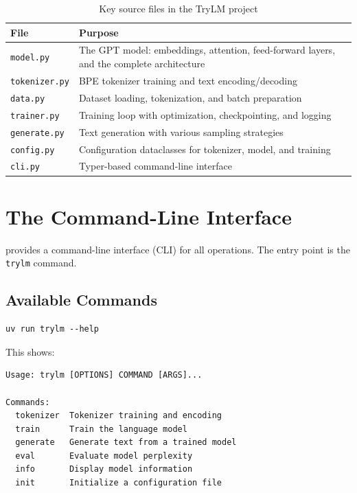 \begin{table}[H]
\centering
\begin{tabular}{lp{8cm}}
\toprule
\textbf{File} & \textbf{Purpose} \\
\midrule
\texttt{model.py} & The GPT model: embeddings, attention, feed-forward layers, and the complete architecture \\
\texttt{tokenizer.py} & BPE tokenizer training and text encoding/decoding \\
\texttt{data.py} & Dataset loading, tokenization, and batch preparation \\
\texttt{trainer.py} & Training loop with optimization, checkpointing, and logging \\
\texttt{generate.py} & Text generation with various sampling strategies \\
\texttt{config.py} & Configuration dataclasses for tokenizer, model, and training \\
\texttt{cli.py} & Typer-based command-line interface \\
\bottomrule
\end{tabular}
\caption{Key source files in the TryLM project}
\end{table}

\section{The Command-Line Interface}

\TryLM provides a command-line interface (CLI) for all operations. The entry point is the \texttt{trylm} command.

\subsection{Available Commands}

\begin{lstlisting}[style=shell]
uv run trylm --help
\end{lstlisting}

This shows:
\begin{lstlisting}[style=shell, numbers=none]
Usage: trylm [OPTIONS] COMMAND [ARGS]...

Commands:
  tokenizer  Tokenizer training and encoding
  train      Train the language model
  generate   Generate text from a trained model
  eval       Evaluate model perplexity
  info       Display model information
  init       Initialize a configuration file
\end{lstlisting}

